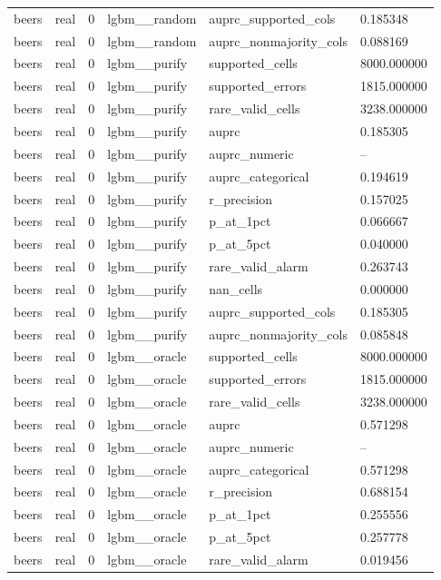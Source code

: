 \begin{tabular}{llllll}
beers & real & 0 & lgbm\_\_random & auprc\_supported\_cols & 0.185348 \\
beers & real & 0 & lgbm\_\_random & auprc\_nonmajority\_cols & 0.088169 \\
beers & real & 0 & lgbm\_\_purify & supported\_cells & 8000.000000 \\
beers & real & 0 & lgbm\_\_purify & supported\_errors & 1815.000000 \\
beers & real & 0 & lgbm\_\_purify & rare\_valid\_cells & 3238.000000 \\
beers & real & 0 & lgbm\_\_purify & auprc & 0.185305 \\
beers & real & 0 & lgbm\_\_purify & auprc\_numeric & -- \\
beers & real & 0 & lgbm\_\_purify & auprc\_categorical & 0.194619 \\
beers & real & 0 & lgbm\_\_purify & r\_precision & 0.157025 \\
beers & real & 0 & lgbm\_\_purify & p\_at\_1pct & 0.066667 \\
beers & real & 0 & lgbm\_\_purify & p\_at\_5pct & 0.040000 \\
beers & real & 0 & lgbm\_\_purify & rare\_valid\_alarm & 0.263743 \\
beers & real & 0 & lgbm\_\_purify & nan\_cells & 0.000000 \\
beers & real & 0 & lgbm\_\_purify & auprc\_supported\_cols & 0.185305 \\
beers & real & 0 & lgbm\_\_purify & auprc\_nonmajority\_cols & 0.085848 \\
beers & real & 0 & lgbm\_\_oracle & supported\_cells & 8000.000000 \\
beers & real & 0 & lgbm\_\_oracle & supported\_errors & 1815.000000 \\
beers & real & 0 & lgbm\_\_oracle & rare\_valid\_cells & 3238.000000 \\
beers & real & 0 & lgbm\_\_oracle & auprc & 0.571298 \\
beers & real & 0 & lgbm\_\_oracle & auprc\_numeric & -- \\
beers & real & 0 & lgbm\_\_oracle & auprc\_categorical & 0.571298 \\
beers & real & 0 & lgbm\_\_oracle & r\_precision & 0.688154 \\
beers & real & 0 & lgbm\_\_oracle & p\_at\_1pct & 0.255556 \\
beers & real & 0 & lgbm\_\_oracle & p\_at\_5pct & 0.257778 \\
beers & real & 0 & lgbm\_\_oracle & rare\_valid\_alarm & 0.019456 \\

\end{tabular}

